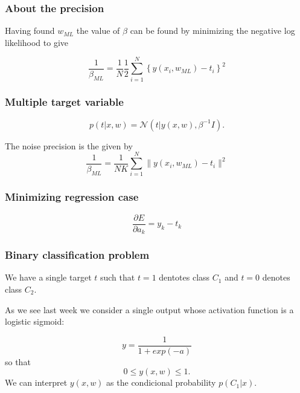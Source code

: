 \begin{frame}
  \frametitle{About the precision}

  Having found $w_{ML}$ the value of $\beta$ can be found by minimizing the negative log likelihood to give 

  \begin{equation}
    \frac{1}{\beta_{ML}}
    = 
    \frac{1}{N}
    \frac{1}{2} 
    \sum_{i = 1}^N
    \left\{
      y(x_i, w_{ML})
      -
      t_i
    \right\}^2
  \end{equation}

\end{frame}

\begin{frame}
  \frametitle{Multiple target variable}

  \begin{equation}
    p(t | x, w)
    = 
    \mathcal{N}(t | y(x,w), \beta^{-1} I). 
  \end{equation}

  The noise precision is the given by 
  \begin{equation}
    \frac{1}{\beta_{ML}}
    = 
    \frac{1}{N K}
    \sum_{i = 1}^N
    \|
    y(x_i, w_{ML}) - t_i
    \|^2
  \end{equation}
\end{frame}

\begin{frame}
  \frametitle{Minimizing regression case}
\begin{equation}
  \frac{\partial E}{\partial a_k}
  = y_k  - t_k
\end{equation}
\end{frame}

\begin{frame}
  \frametitle{Binary classification problem}
We have a single target $t$ such that $t = 1$
dentotes class $C_1$ and $t=0$ denotes class
$C_2$. 

As we see last week we consider a single output whose
activation function is a logistic sigmoid: 

\begin{equation}
  y = 
  \frac{1}{1 + exp(-a)}
\end{equation}
so that 
\begin{equation}
  0 
  \leq 
  y(x,w)
  \leq
  1.
\end{equation}
We can interpret $y(x,w)$ as the condicional probability 
$p(C_1 |x)$.
\end{frame}

